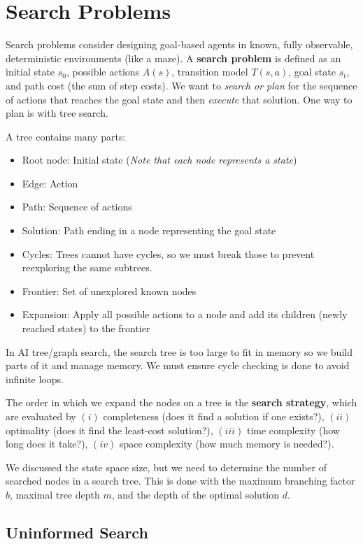 \documentclass{report}
\begin{document}
\chapter{Search Problems}

Search problems consider designing goal-based agents in known, fully observable, deterministic environments (like a maze). A \textbf{search problem} is defined as an initial state $s_0$, possible actions $A(s)$, transition model $T(s,a)$, goal state $s_t$, and path cost (the sum of step costs). We want to \emph{search or plan} for the sequence of actions that reaches the goal state and then \emph{execute} that solution.  One way to plan is with tree search.

A tree contains many parts:
\begin{itemize}
    \item Root node: Initial state (\emph{Note that each node represents a state})
    \item Edge: Action
    \item Path: Sequence of actions
    \item Solution: Path ending in a node representing the goal state
    \item Cycles: Trees cannot have cycles, so we must break those to prevent reexploring the same subtrees.
    \item Frontier: Set of unexplored known nodes
    \item Expansion: Apply all possible actions to a node and add its children (newly reached states) to the frontier
\end{itemize}

In AI tree/graph search, the search tree is too large to fit in memory so we build parts of it and manage memory. We must ensure cycle checking is done to avoid infinite loops.

The order in which we expand the nodes on a tree is the \textbf{search strategy}, which are evaluated by $(i)$ completeness (does it find a solution if one exists?), $(ii)$ optimality (does it find the least-cost solution?), $(iii)$ time complexity (how long does it take?), $(iv)$ space complexity (how much memory is needed?).

We discussed the state space size, but we need to determine the number of searched nodes in a search tree. This is done with the maximum branching factor $b$, maximal tree depth $m$, and the depth of the optimal solution $d$.

\section{Uninformed Search}
\end{document}
